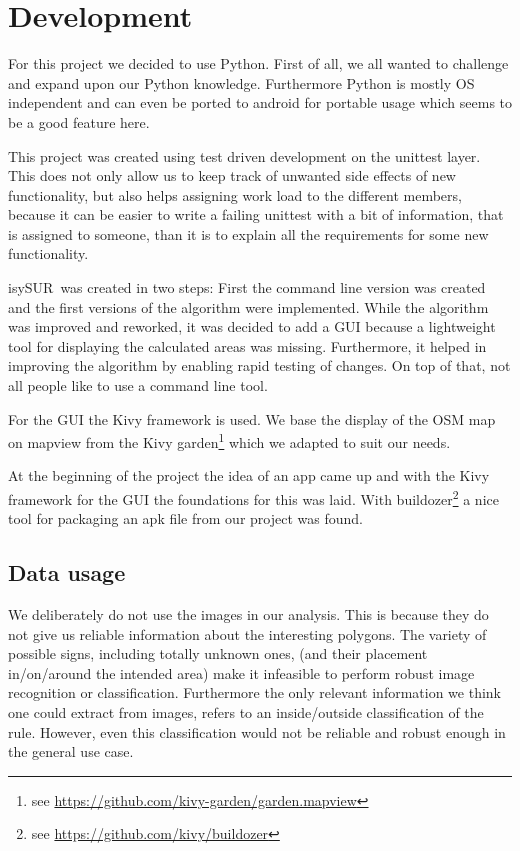 \documentclass[11pt,fleqn]{book} %
\newcommand{\todol}{\todo[inline]} %
\newcommand{\ProjectTitle}{isySUR}
\newcommand{\pt}{\ProjectTitle}
\begin{document}
\todol{Code documentation -> pydoc?}

\section{Development}
For this project we decided to use Python. First of all, we all wanted to challenge and expand upon our Python knowledge. Furthermore Python is mostly OS independent and can even be ported to android for portable usage which seems to be a good feature here.

This project was created using test driven development on the unittest layer. This does not only allow us to keep track of unwanted side effects of new functionality, but also helps assigning work load to the different members, because it can be easier to write a failing unittest with a bit of information, that is assigned to someone, than it is to explain all the requirements for some new functionality.

\pt\ was created in two steps: First the command line version was created and the first versions of the algorithm were implemented. While the algorithm was improved and reworked, it was decided to add a GUI because a lightweight tool for displaying the calculated areas was missing. Furthermore, it helped in improving the algorithm by enabling rapid testing of changes. On top of that, not all people like to use a command line tool.

For the GUI the Kivy framework is used. We base the display of the OSM map on mapview from the Kivy garden\footnote{see \url{https://github.com/kivy-garden/garden.mapview}} which we adapted to suit our needs.

At the beginning of the project the idea of an app came up and with the Kivy framework for the GUI the foundations for this was laid. With buildozer\footnote{see \url{https://github.com/kivy/buildozer}} a nice tool for packaging an apk file from our project was found.

\subsection{Data usage}\label{sec:config} %
We deliberately do not use the images in our analysis. This is because they do not give us reliable information about the interesting polygons. The variety of possible signs, including totally unknown ones, (and their placement in/on/around the intended area) make it infeasible to perform robust image recognition or classification. Furthermore the only relevant information we think one could extract from images, refers to an inside/outside classification of the rule. However, even this classification would not be reliable and robust enough in the general use case.
\end{document}
